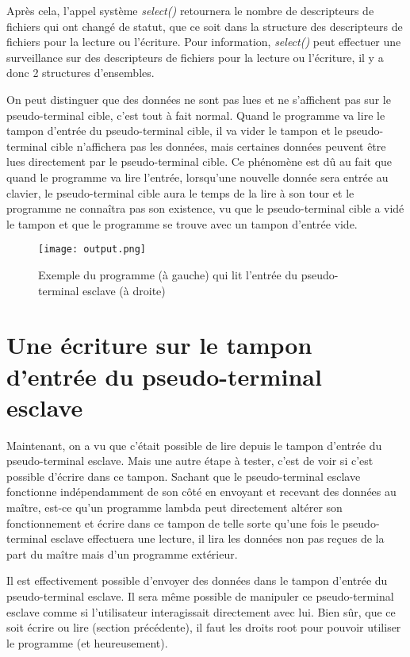 Après cela, l'appel système \textit{select()} retournera le nombre de descripteurs de fichiers qui ont changé de statut, que ce soit dans la structure des descripteurs de fichiers pour la lecture ou l'écriture. Pour information, \textit{select()} peut effectuer une surveillance sur des descripteurs de fichiers pour la lecture ou l'écriture, il y a donc 2 structures d'ensembles.

On peut distinguer que des données ne sont pas lues et ne s'affichent pas sur le pseudo-terminal cible, c'est tout à fait normal. Quand le programme va lire le tampon d'entrée du pseudo-terminal cible, il va vider le tampon et le pseudo-terminal cible n'affichera pas les données, mais certaines données peuvent être lues directement par le pseudo-terminal cible. Ce phénomène est dû au fait que quand le programme va lire l'entrée, lorsqu'une nouvelle donnée sera entrée au clavier, le pseudo-terminal cible aura le temps de la lire à son tour et le programme ne connaîtra pas son existence, vu que le pseudo-terminal cible a vidé le tampon et que le programme se trouve avec un tampon d'entrée vide.

\begin{figure}[h]
        \centering
	\texttt{[image: output.png]}
	\caption{Exemple du programme (à gauche) qui lit l'entrée du pseudo-terminal esclave (à droite)}
\end{figure}

\section{Une écriture sur le tampon d'entrée du pseudo-terminal esclave}
Maintenant, on a vu que c'était possible de lire depuis le tampon d'entrée du pseudo-terminal esclave. Mais une autre étape à tester, c'est de voir si c'est possible d'écrire dans ce tampon. Sachant que le pseudo-terminal esclave fonctionne indépendamment de son côté en envoyant et recevant des données au maître, est-ce qu'un programme lambda peut directement altérer son fonctionnement et écrire dans ce tampon de telle sorte qu'une fois le pseudo-terminal esclave effectuera une lecture, il lira les données non pas reçues de la part du maître mais d'un programme extérieur.

Il est effectivement possible d'envoyer des données dans le tampon d'entrée du pseudo-terminal esclave. Il sera même possible de manipuler ce pseudo-terminal esclave comme si l'utilisateur interagissait directement avec lui. Bien sûr, que ce soit écrire ou lire (section précédente), il faut les droits root pour pouvoir utiliser le programme (et heureusement).

